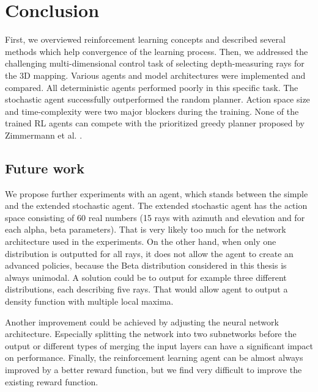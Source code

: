\section{Conclusion}
First, we overviewed reinforcement learning concepts and described several methods which help convergence of the learning process. Then, we addressed the challenging multi-dimensional control task of selecting depth-measuring rays for the 3D mapping. Various agents and model architectures were implemented and compared. All deterministic agents performed poorly in this specific task. The stochastic agent successfully outperformed the random planner. Action space size and time-complexity were two major blockers during the training. None of the trained RL agents can compete with the prioritized greedy planner proposed by Zimmermann et al. \cite{zimmermann2017}.


\subsection{Future work}
We propose further experiments with an agent, which stands between the simple and the extended stochastic agent. The extended stochastic agent has the action space consisting of 60 real numbers (15 rays with azimuth and elevation and for each alpha, beta parameters). That is very likely too much for the network architecture used in the experiments. On the other hand, when only one distribution is outputted for all rays, it does not allow the agent to create an advanced policies, because the Beta distribution considered in this thesis is always unimodal. A solution could be to output for example three different distributions, each describing five rays. That would allow agent to output a density function with multiple local maxima. \par Another improvement could be achieved by adjusting the neural network architecture. Especially splitting the network into two subnetworks before the output or different types of merging the input layers can have a significant impact on performance. Finally, the reinforcement learning agent can be almost always improved by a better reward function, but we find very difficult to improve the existing reward function.
